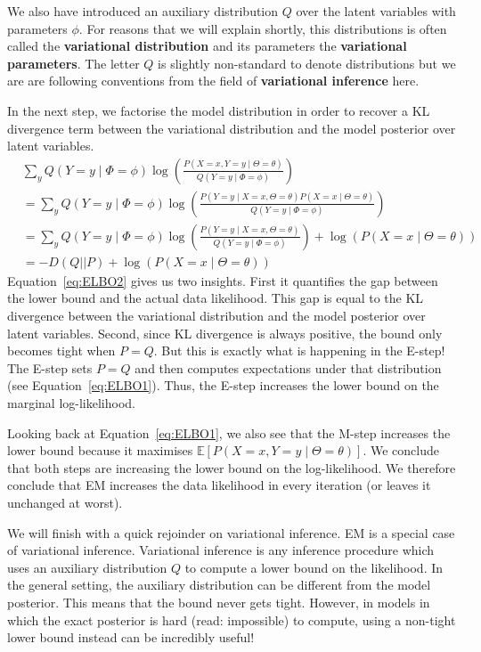 \documentclass[a4paper,11pt,leqno]{report}\usepackage[]{graphicx}\usepackage[]{color}
\newcommand{\E}{\mathbb{E}}
\begin{document}
We also have introduced
an auxiliary distribution $ Q $ over the latent variables with parameters $ \phi $. 
For reasons that we will explain shortly,
this distributions is often called the \textbf{variational distribution} and its parameters the
\textbf{variational parameters}. The letter $ Q $ is slightly non-standard to denote distributions but
we are are following conventions from the field of \textbf{variational inference} here.

In the next step, we factorise the model distribution in order to recover a KL divergence term between
the variational distribution and the model posterior over latent variables.
\begin{align}
&\sum_{y} Q(Y=y \mid \Phi=\phi) \log\left(\frac{P(X=x, Y=y \mid  \Theta = \theta)}{Q(Y=y \mid \Phi=\phi)}\right) \\
&= \sum_{y} Q(Y=y \mid \Phi=\phi) \log\left(\frac{P(Y=y \mid X=x, \Theta = \theta)P(X=x \mid \Theta = \theta)}{Q(Y=y \mid \Phi=\phi)}\right) \\
&= \sum_{y} Q(Y=y \mid \Phi=\phi) \log\left(\frac{P(Y=y \mid X=x, \Theta = \theta)}{Q(Y=y \mid \Phi=\phi)}\right) + \log(P(X=x \mid \Theta=\theta)) \\
&= -D(Q||P) + \log(P(X=x \mid \Theta=\theta)) \label{eq:ELBO2}
\end{align}
Equation~\eqref{eq:ELBO2} gives us two insights. First it quantifies the gap between the lower bound
and the actual data likelihood. This gap is equal to the KL divergence between the variational distribution
and the model posterior over latent variables. Second, since KL divergence is always positive, the bound only becomes
tight when $ P=Q $. But this is exactly what is happening in the E-step! The E-step sets $ P=Q $ and
then computes expectations under that distribution (see Equation~\eqref{eq:ELBO1}). Thus, the E-step increases
the lower bound on the marginal log-likelihood.

Looking back at Equation~\eqref{eq:ELBO1}, we also see that the M-step increases the lower bound because 
it maximises $ \E\left[P(X=x, Y=y\mid \Theta = \theta)\right] $. We conclude that both steps
are increasing the lower bound on the log-likelihood. We therefore conclude that EM increases the data likelihood
in every iteration (or leaves it unchanged at worst).

We will finish with a quick rejoinder on variational inference. EM is a special case of variational inference.
Variational inference is any inference procedure which uses an auxiliary distribution $ Q $ to compute
a lower bound on the likelihood. In the general setting, the auxiliary distribution can be different from the 
model posterior. This means that the bound never gets tight. However, in models in which the exact posterior 
is hard (read: impossible) to compute, using a non-tight lower bound instead can be incredibly useful!
\end{document}
